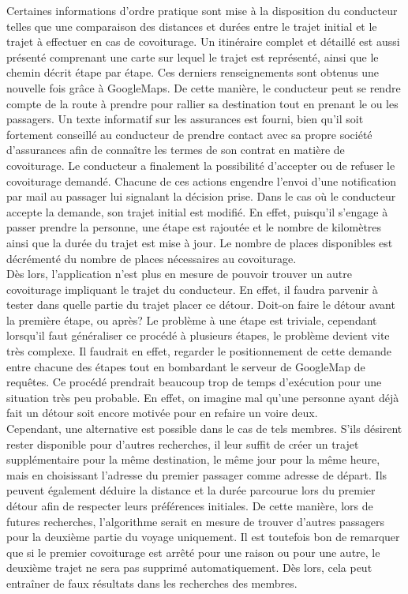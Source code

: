\documentclass[12pt, a4paper, oneside]{article}
\begin{document}
        \indent Certaines informations d'ordre pratique sont mise à la disposition du conducteur telles que une comparaison des distances et durées entre le trajet initial et le trajet à effectuer en cas de covoiturage. Un itinéraire complet et détaillé est aussi présenté comprenant une carte sur lequel le trajet est représenté, ainsi que le chemin décrit étape par étape. Ces derniers renseignements sont obtenus une nouvelle fois grâce à GoogleMaps. De cette manière, le conducteur peut se rendre compte de la route à prendre pour rallier sa destination tout en prenant le ou les passagers. Un texte informatif sur les assurances est fourni, bien qu'il soit fortement conseillé au conducteur de prendre contact avec sa propre société d'assurances afin de connaître les termes de son contrat en matière de covoiturage. Le conducteur a finalement la possibilité d'accepter ou de refuser le covoiturage demandé. Chacune de ces actions engendre l'envoi d'une notification par mail au passager lui signalant la décision prise. Dans le cas où le conducteur accepte la demande, son trajet initial est modifié. En effet, puisqu'il s'engage à passer prendre la personne, une étape est rajoutée et le nombre de kilomètres ainsi que la durée du trajet est mise à jour. Le nombre de places disponibles est décrémenté du nombre de places nécessaires au covoiturage.\\
        \indent Dès lors, l'application n'est plus en mesure de pouvoir trouver un autre covoiturage impliquant le trajet du conducteur. En effet, il faudra parvenir à tester dans quelle partie du trajet placer ce détour. Doit-on faire le détour avant la première étape, ou après? Le problème à une étape est triviale, cependant lorsqu'il faut généraliser ce procédé à plusieurs étapes, le problème devient vite très complexe. Il faudrait en effet, regarder le positionnement de cette demande entre chacune des étapes tout en bombardant le serveur de GoogleMap de requêtes. Ce procédé prendrait beaucoup trop de temps d'exécution pour une situation très peu probable. En effet, on imagine mal qu'une personne ayant déjà fait un détour soit encore motivée pour en refaire un voire deux.\\
        \indent Cependant, une alternative est possible dans le cas de tels membres. S'ils désirent rester disponible pour d'autres recherches, il leur suffit de créer un trajet supplémentaire pour la même destination, le même jour pour la même heure, mais en choisissant l'adresse du premier passager comme adresse de départ. Ils peuvent également déduire la distance et la durée parcourue lors du premier détour afin de respecter leurs préférences initiales. De cette manière, lors de futures recherches, l'algorithme serait en mesure de trouver d'autres passagers pour la deuxième partie du voyage uniquement. Il est toutefois bon de remarquer que si le premier covoiturage est arrêté pour une raison ou pour une autre, le deuxième trajet ne sera pas supprimé automatiquement. Dès lors, cela peut entraîner de faux résultats dans les recherches des membres.\\\\
\end{document}
